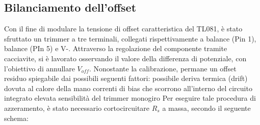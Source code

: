 \documentclass[a4paper, oneside]{article}
\begin{document}
\subsection{Bilanciamento dell'offset}
Con il fine di modulare la tensione di offset caratteristica del TL081, è stato sfruttato un trimmer a tre terminali, collegati rispettivamente a balance (Pin 1), balance (PIn 5) e V-. Attraverso la regolazione del componente tramite cacciavite, si è lavorato osservando il valore della differenza di potenziale, con l'obiettivo di annullare $V_{off}$. Nonostante la calibrazione, permane un offset residuo spiegabile dai possibili seguenti fattori:
possibile deriva termica (drift) dovuta al calore della mano
correnti di bias che scorrono all'interno del circuito integrato
elevata sensibilità del trimmer monogiro
Per eseguire tale procedura di azzeramento, è stato necessario cortocircuitare $R_s$ a massa, secondo il seguente schema:
\end{document}
